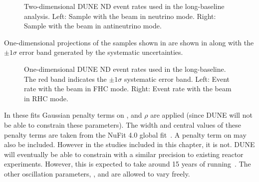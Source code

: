 \begin{figure}[h]
	\begin{minipage}[t]{.5\linewidth}
		\begin{adjustbox}{max totalsize=\linewidth, center}
			
		\end{adjustbox}
	\end{minipage}
	\hfill
	\begin{minipage}[t]{.5\linewidth}
		\begin{adjustbox}{max totalsize=\linewidth, center}
			
		\end{adjustbox}
	\end{minipage}
	\caption[Two-dimensional DUNE ND event rates used in the long-baseline analysis]{Two-dimensional DUNE ND event rates used in the long-baseline analysis. Left: Sample with the beam in neutrino mode. Right: Sample with the beam in antineutrino mode.}
	\label{fig:ndEventRates}
\end{figure}

One-dimensional projections of the samples shown in  are shown in  along with the $\pm1\sigma$ error band generated by the systematic uncertainties.
\begin{figure}
	\begin{minipage}[t]{.5\linewidth}
		\begin{adjustbox}{max totalsize=\linewidth, center}
				
		\end{adjustbox}
	\end{minipage}
	\hfill
	\begin{minipage}[t]{.5\linewidth}
		\begin{adjustbox}{max totalsize=\linewidth, center}
				
		\end{adjustbox}
	\end{minipage}
	\caption[One-dimensional DUNE ND event rates used in the long-baseline analysis with $\pm1\sigma$ systematic error band.]{One-dimensional DUNE ND event rates used in the long-baseline. The red band indicates the $\pm1\sigma$ systematic error band. Left: Event rate with the beam in FHC mode. Right: Event rate with the beam in RHC mode.}
	\label{fig:ndEventRatesWithError}
\end{figure}


In these fits Gaussian penalty terms on ,  and $\rho$ are applied (since DUNE will not be able to constrain these parameters).
The width and central values of these penalty terms are taken from the NuFit 4.0 global fit~\cite{nufit4}.
A penalty term on  may also be included.
However in the studies included in this chapter, it is not.
DUNE will eventually be able to constrain  with a similar precision to existing reactor experiments. 
However, this is expected to take around 15 years of running~\cite{tdrVol2}.
The other oscillation parameters, ,  and \dcp are allowed to vary freely.

